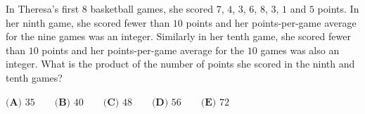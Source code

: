 In Theresa's first $8$ basketball games, she scored $7$, $4$, $3$, $6$, $8$, $3$, $1$ and $5$ points. In her ninth game, she scored fewer than $10$ points and her points-per-game average for the nine games was an integer. Similarly in her tenth game, she scored fewer than $10$ points and her points-per-game average for the $10$ games was also an integer. What is the product of the number of points she scored in the ninth and tenth games?

$\textbf{(A) }35\qquad\textbf{(B) }40\qquad\textbf{(C) }48\qquad\textbf{(D) }56\qquad\textbf{(E) }72$

